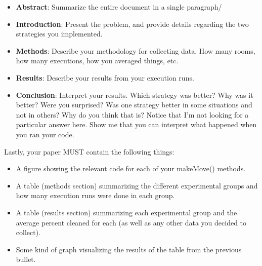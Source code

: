 \documentclass[paper=a4, fontsize=11pt, parskip=full]{scrartcl} %
\numberwithin{equation}{section} %
\numberwithin{figure}{section} %
\numberwithin{table}{section} %
\begin{document}
\begin{itemize}
	\item \textbf{Abstract}: Summarize the entire document in a single paragraph/
	\item \textbf{Introduction}: Present the problem, and provide details regarding the two strategies you implemented.
	\item \textbf{Methods}: Describe your methodology for collecting data. How many rooms, how many executions, how you averaged things, etc.
	\item \textbf{Results}: Describe your results from your execution runs.
	\item \textbf{Conclusion}: Interpret your results. Which strategy was better? Why was it better? Were you surprised? Was one strategy better in some situations and not in others? Why do you think that is? Notice that I'm not looking for a particular answer here. Show me that you can interpret what happened when you ran your code.
\end{itemize}

Lastly, your paper MUST contain the following things:

\begin{itemize}
	\item A figure showing the relevant code for each of your makeMove() methods.
	\item A table (methods section) summarizing the different experimental groups and how many execution runs were done in each group.
	\item A table (results section) summarizing each experimental group and the average percent cleaned for each (as well as any other data you decided to collect).
	\item Some kind of graph visualizing the results of the table from the previous bullet.
\end{itemize}


\end{document}

